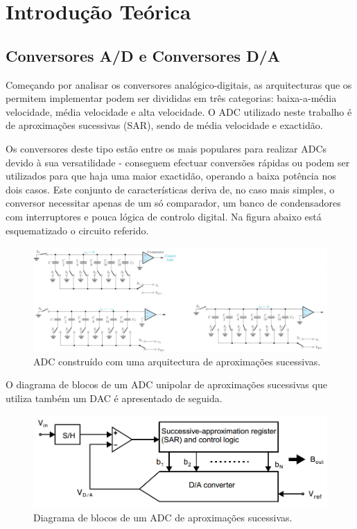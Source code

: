 \documentclass[11pt]{article}
\numberwithin{equation}{section}
\begin{document}
\section{Introdução Teórica}
\subsection{Conversores A/D e Conversores D/A}

Começando por analisar os conversores analógico-digitais, as arquitecturas que os permitem implementar podem ser divididas em três categorias: baixa-a-média velocidade, média velocidade e alta velocidade. O ADC utilizado neste trabalho é de aproximações sucessivas (SAR), sendo de média velocidade e exactidão. 

Os conversores deste tipo estão entre os mais populares para realizar ADCs devido à sua versatilidade - conseguem efectuar conversões rápidas ou podem ser utilizados para que haja uma maior exactidão, operando a baixa potência nos dois casos. Este conjunto de características deriva de, no caso mais simples, o conversor necessitar apenas de um só comparador, um banco de condensadores com interruptores e pouca lógica de controlo digital. Na figura abaixo está esquematizado o circuito referido.

\begin{figure}[h]
	\centering
	\includegraphics[keepaspectratio=true, scale=0.47]{./teoricas/SAR_1}
	\caption{ADC construído com uma arquitectura de aproximações sucessivas.}
	\vspace{-0.8em}
\end{figure}

O diagrama de blocos de um ADC unipolar de aproximações sucessivas que utiliza também um DAC é apresentado de seguida.
	
\begin{figure}[h]
	\centering
	\includegraphics[keepaspectratio=true, scale=0.32]{./teoricas/SAR_2}
	\caption{Diagrama de blocos de um ADC de aproximações sucessivas.}
	\vspace{-0.8em}
\end{figure}
\end{document}
